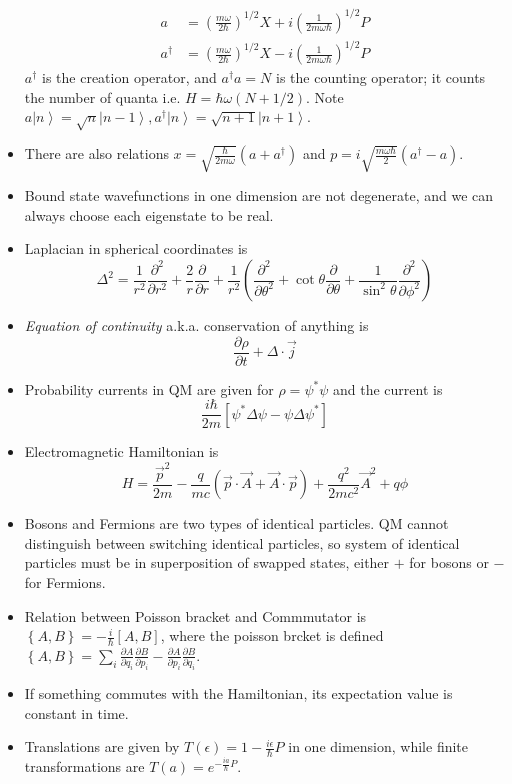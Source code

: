 \documentclass[10pt]{report}
\newcommand{\ket}[1]{\left|#1\right>}
\newcommand{\pd}[2]{\frac{\partial #1}{\partial#2}}
\newcommand{\ptd}[2]{\frac{\partial^2 #1}{\partial#2^2}}
\begin{document}
\begin{itemize}
		\begin{align}
			a&=\left( \frac{m\omega}{2\hbar} \right)^{1/2}X + i\left( \frac{1}{2m\omega\hbar} \right)^{1/2}P\\
			a^\dagger&=\left( \frac{m\omega}{2\hbar} \right)^{1/2}X - i\left( \frac{1}{2m\omega\hbar} \right)^{1/2}P
		\end{align}
		$a^\dagger$ is the creation operator, and $a^\dagger a=N$ is the counting operator; it counts the number of quanta i.e. $H=\hbar\omega(N+1/2)$. Note $a\ket{n} = \sqrt{n}\ket{n-1}, a^\dagger\ket{n} = \sqrt{n+1}\ket{n+1}$.
	\item There are also relations $x=\sqrt{\frac{\hbar}{2m\omega}}\left( a+a^\dagger \right)$ and $p = i\sqrt{\frac{m\omega\hbar}{2}}\left( a^\dagger -a \right)$.
	\item Bound state wavefunctions in one dimension are not degenerate, and we can always choose each eigenstate to be real.
	\item Laplacian in spherical coordinates is
		$$\Delta^2 = \frac{1}{r^2}\ptd{}{r} + \frac{2}{r}\pd{}{r} + \frac{1}{r^2}\left( \ptd{}{\theta} + \cot \theta \pd{}{\theta} + \frac{1}{\sin^2\theta}\ptd{}{\phi} \right)$$
	\item \emph{Equation of continuity} a.k.a. conservation of anything is
		$$\pd{\rho}{t} + \Delta\cdot \vec{j}$$
	\item Probability currents in QM are given for $\rho = \psi^*\psi$ and the current is 
		$$\frac{i\hbar}{2m} \left[ \psi^*\Delta\psi - \psi\Delta\psi^* \right]$$
	\item Electromagnetic Hamiltonian is 
		$$H = \frac{\vec{p}^2}{2m} - \frac{q}{mc} \left( \vec{p}\cdot \vec{A} + \vec{A} \cdot \vec{p} \right) + \frac{q^2}{2mc^2}\vec{A}^2 + q\phi$$
	\item Bosons and Fermions are two types of identical particles. QM cannot distinguish between switching identical particles, so system of identical particles must be in superposition of swapped states, either $+$ for bosons or $-$ for Fermions.
	\item Relation between Poisson bracket and Commmutator is $\left\{ A,B \right\} = -\frac{i}{\hbar}\left[ A,B \right]$, where the poisson brcket is defined $\left\{ A,B \right\} = \sum_i \pd{A}{q_i}\pd{B}{p_i} - \pd{A}{p_i}\pd{B}{q_i}$. 
	\item If something commutes with the Hamiltonian, its expectation value is constant in time.
	\item Translations are given by $T(\epsilon) = 1-\frac{i\epsilon}{\hbar}P$ in one dimension, while finite transformations are $T(a) = e^{-\frac{ia}{\hbar}P}$.

\end{itemize}
\end{document}

